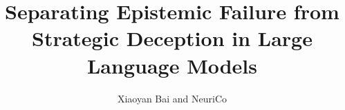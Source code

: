 \documentclass{article}
\title{Separating Epistemic Failure from Strategic Deception in Large Language Models}
\author{Xiaoyan Bai and NeuriCo}
\begin{document}
\maketitle

\begin{abstract}

\end{abstract}









\end{document}

